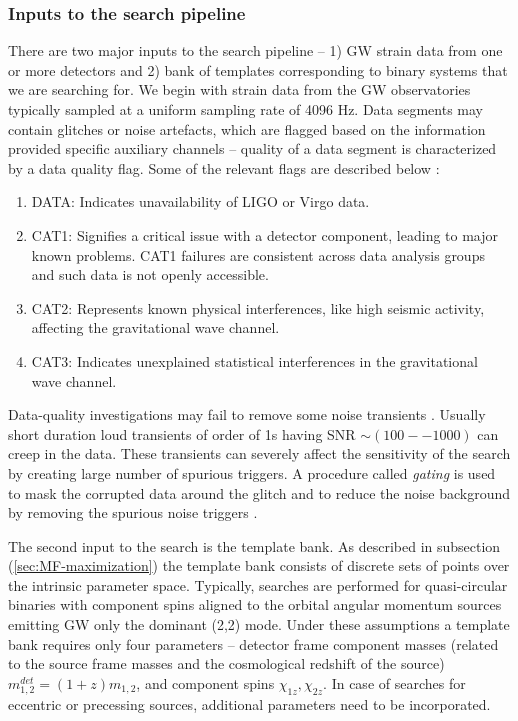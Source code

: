 \subsubsection{Inputs to the search pipeline}
There are two major inputs to the search pipeline -- 1) GW strain data from one or more detectors and 2) bank of templates corresponding to binary systems that we are searching for. We begin with strain data from the GW observatories typically sampled at a uniform sampling rate of 4096 Hz. Data segments may contain glitches or noise artefacts, which are flagged based on the information provided specific auxiliary channels \cite{LIGO:2021ppb} -- quality of a data segment is characterized by a data quality flag. Some of the relevant flags are described below \cite{LIGOScientific:2016gtq}:
\begin{enumerate}
    \item DATA: Indicates unavailability of LIGO or Virgo data.
    \item CAT1: Signifies a critical issue with a detector component, leading to major known problems. CAT1 failures are consistent across data analysis groups and such data is not openly accessible.
    \item CAT2: Represents known physical interferences, like high seismic activity, affecting the gravitational wave channel.
    \item CAT3: Indicates unexplained statistical interferences in the gravitational wave channel.
\end{enumerate}

Data-quality investigations may fail to remove some noise transients \cite{Davis:2018yrz}. Usually short duration loud transients of order of 1s having SNR $\sim (100--1000)$ can creep in the data. These transients can severely affect the sensitivity of the search by creating large number of spurious triggers. A procedure called \textit{gating} is used to mask the corrupted data around the glitch and to reduce the noise background by removing the spurious noise triggers \cite{Usman_pycbc}. 

The second input to the search is the template bank. As described in subsection (\ref{sec:MF-maximization}) the template bank consists of discrete sets of points over the intrinsic parameter space. Typically, searches are performed for quasi-circular binaries with component spins aligned to the orbital angular momentum sources emitting GW only the dominant (2,2) mode. Under these assumptions a template bank requires only four parameters -- detector frame component masses (related to the source frame masses and the cosmological redshift of the source) $m_{1,2}^{det} = (1+z)m_{1,2}$, and component spins $\chi_{1z}, \chi_{2z}$. In case of searches for eccentric or precessing sources, additional parameters need to be incorporated. 

